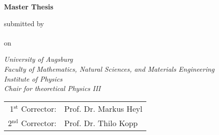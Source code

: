 

\newcommand{\mail}{jonas.kell@student.uni-augsburg.de}



\begin{titlepage}
    
\color{dblue}

\begin{center}
    \vspace*{2cm}
    \Huge
    \textbf{\thetitle}

    \vspace*{1.5cm}
    \color{black}
    \textbf{Master Thesis}

    \vspace*{1cm}
    \normalsize
    submitted by\\
    \LARGE
    \theauthor\\\vspace*{0.3cm}
    \normalsize
    on \thedate

    \vspace{1.8cm}
    \color{black}
    \emph{University of Augsburg}\\
    \emph{Faculty of Mathematics, Natural Sciences, and Materials Engineering}\\
    \emph{Institute of Physics}\\
    \emph{Chair for theoretical Physics III}

    \vfill

    \begin{tabular}{rl}
        1$^\text{st}$ Corrector: &Prof. Dr. Markus Heyl\\
        2$^\text{nd}$ Corrector: &Prof. Dr. Thilo Kopp\\
    \end{tabular}
\end{center}

\end{titlepage}
